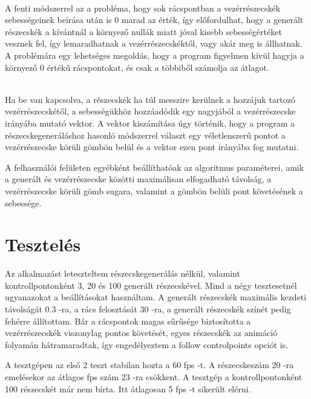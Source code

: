 \begin{description}
\setlength{\parindent}{2ex}
\item [A 0 sebességértékek figyelmen kívül hagyása:] \hfill \\
A fenti módszerrel az a probléma, 
hogy sok rácspontban a vezérrészecskék 
sebességeinek beírása után is 0 marad az érték, 
így előfordulhat, 
hogy a generált részecskék a kívántnál a környező nullák miatt 
jóval kisebb sebességértéket vesznek fel, 
így lemaradhatnak a vezérrészecskéktől, 
vagy akár meg is állhatnak. 
A problémára egy lehetséges megoldás, 
hogy a program figyelmen kívül hagyja a környező 0 értékű rácspontokat, 
és csak a többiből számolja az átlagot.
\item [A vezérrészecskék követése:] \hfill \\
Ha be van kapcsolva, 
a részecskék ha túl messzire kerülnek 
a hozzájuk tartozó vezérrészecskétől, 
a sebességükhöz hozzáadódik egy nagyjából 
a vezérrészecske irányába mutató vektor.
A vektor kiszámítása úgy történik,
hogy a program a részecskegeneráláshoz hasonló módszerrel 
választ egy véletlenszerű pontot a vezérrészecske körüli gömbön belül 
és a vektor ezen pont irányába fog mutatni.

A felhasználói felületen egyébként 
beállíthatóak az algoritmus paraméterei, 
amik a generált és vezérrészecske közötti maximálisan elfogadható távolság, 
a vezérrészecske körüli gömb sugara, 
valamint a gömbön belüli pont követésének a sebessége.
\end{description}

\section{Tesztelés}

Az alkalmazást leteszteltem részecskegenerálás nélkül,
valamint kontrollpontonként 3, 20 és 100 generált részecskével.
Mind a négy tesztesetnél ugyanazokat a beállításokat használtam.
A generált részecskék maximális kezdeti távolságát 0.3 -ra, 
a rács felosztását 30 -ra, 
a generált részecskék színét pedig fehérre állítottam.
Bár a rácspontok magas sűrűsége biztosította 
a vezérrészecskék viszonylag pontos követését, 
egyes részecskék az animáció folyamán hátramaradtak,
így engedélyeztem a {\ttfamily follow controlpoints} opciót is.

A tesztgépen az első 2 teszt stabilan hozta a 60 fps -t.
A részecskeszám 20 -ra emelésekor az átlagos fps szám 23 -ra csökkent.
A tesztgép a kontrollpontonként 100 részecskét már nem bírta. 
Itt átlagosan 5 fps -t sikerült elérni.

